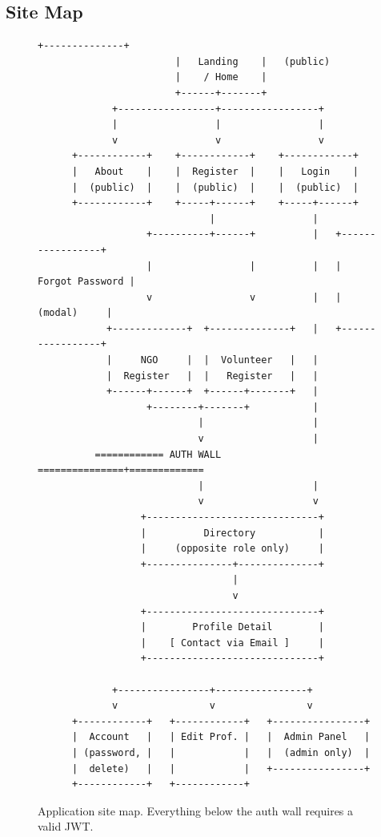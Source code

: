 \documentclass[11pt,letterpaper]{article}
\begin{document}
\subsection{Site Map}

\begin{figure}[H]
\centering
\begin{BVerbatim}[fontsize=\footnotesize]
                        +--------------+
                        |   Landing    |   (public)
                        |    / Home    |
                        +------+-------+
             +-----------------+-----------------+
             |                 |                 |
             v                 v                 v
      +------------+    +------------+    +------------+
      |   About    |    |  Register  |    |   Login    |
      |  (public)  |    |  (public)  |    |  (public)  |
      +------------+    +-----+------+    +-----+------+
                              |                 |
                   +----------+------+          |   +-----------------+
                   |                 |          |   | Forgot Password |
                   v                 v          |   |     (modal)     |
            +-------------+  +--------------+   |   +-----------------+
            |     NGO     |  |  Volunteer   |   |
            |  Register   |  |   Register   |   |
            +------+------+  +------+-------+   |
                   +--------+-------+           |
                            |                   |
                            v                   |
          ============ AUTH WALL ===============+=============
                            |                   |
                            v                   v
                  +------------------------------+
                  |          Directory           |
                  |     (opposite role only)     |
                  +---------------+--------------+
                                  |
                                  v
                  +------------------------------+
                  |        Profile Detail        |
                  |    [ Contact via Email ]     |
                  +------------------------------+

             +----------------+----------------+
             v                v                v
      +------------+   +------------+   +----------------+
      |  Account   |   | Edit Prof. |   |  Admin Panel   |
      | (password, |   |            |   |  (admin only)  |
      |  delete)   |   |            |   +----------------+
      +------------+   +------------+
\end{BVerbatim}
\caption{Application site map. Everything below the auth wall requires a valid JWT.}
\end{figure}
\end{document}

